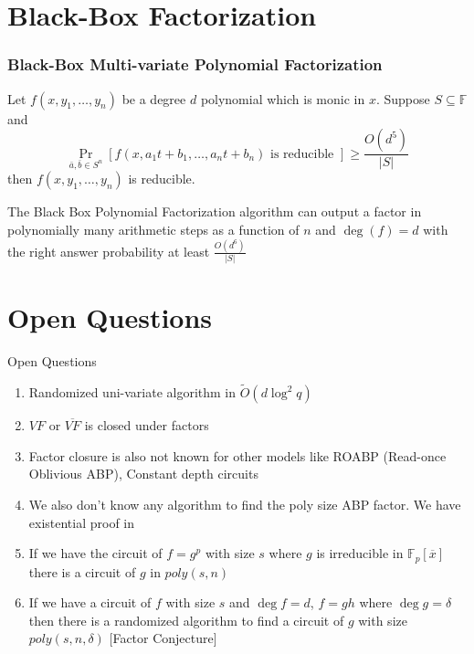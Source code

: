 \documentclass[10pt]{beamer}
\begin{document}

\section{Black-Box Factorization}
\begin{frame}
	\frametitle{Black-Box Multi-variate Polynomial Factorization}
	
	\begin{theorem}
		Let $f\left(x, y_1, \ldots, y_n\right)$ be a degree $d$ polynomial which is monic in $x$. Suppose $S \subseteq \mathbb{F}$ and $$\operatorname{Pr}_{\bar{a}, \bar{b} \in S^n}\left[f\left(x, a_1 t+b_1, \ldots, a_n t+b_n\right) \text { is reducible }\right] \geq \frac{O\left(d^5\right)}{|S|}
$$
then $f\left(x, y_1, \ldots, y_n\right)$ is reducible.
	\end{theorem}
	
	\begin{theorem}
	    The Black Box Polynomial Factorization algorithm can  output a factor in polynomially many arithmetic steps as a function of $n$ and $\deg(f)=d$ with the right answer probability at least $\frac{O(d^6)}{|S|}$ 
	\end{theorem}
\end{frame}

\section{Open Questions}
\begin{frame}{Open Questions}
    \begin{enumerate}
    	\item Randomized uni-variate algorithm in $\tilde{O}(d\log^2 q)$
        \item $VF$ or $\overline{VF}$ is closed under factors
        \item Factor closure is also not known for other models like ROABP (Read-once Oblivious ABP), Constant depth circuits
        \item We also don't know any algorithm to find the poly size ABP factor. We have existential proof in \cite{abpfactor}
        \item If we have the circuit of $f=g^p$ with size $s$ where $g$ is irreducible in $\mathbb{F}_p[\overline{x}]$ there is a circuit of $g$ in $poly(s,n)$
        \item  If we have a circuit of $f$ with size $s$ and $\deg f=d$, $f=gh$ where $\deg g =\delta$ then there is a randomized algorithm to find a circuit of $g$ with size $poly(s,n,\delta)$ [Factor Conjecture]
    \end{enumerate}
\end{frame}
\end{document}
